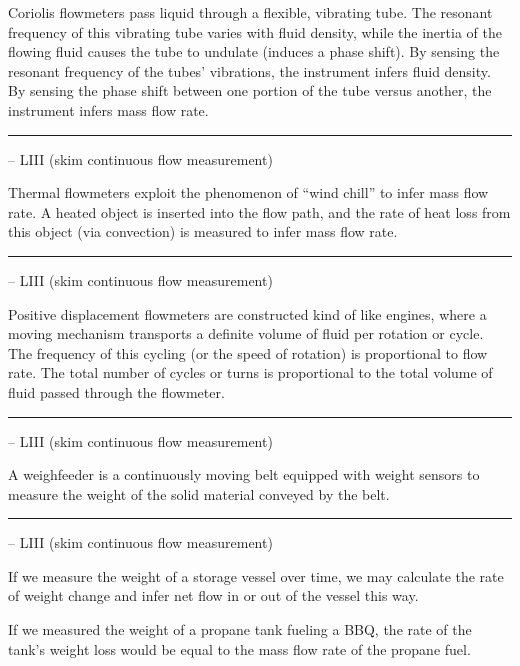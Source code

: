 Coriolis flowmeters pass liquid through a flexible, vibrating tube.  The resonant frequency of this vibrating tube varies with fluid density, while the inertia of the flowing fluid causes the tube to undulate (induces a phase shift).  By sensing the resonant frequency of the tubes' vibrations, the instrument infers fluid density.  By sensing the phase shift between one portion of the tube versus another, the instrument infers mass flow rate.

\vskip 5pt \hrule \vskip 5pt  -- LIII (skim continuous flow measurement) \vskip 10pt

Thermal flowmeters exploit the phenomenon of ``wind chill'' to infer mass flow rate.  A heated object is inserted into the flow path, and the rate of heat loss from this object (via convection) is measured to infer mass flow rate.

\vskip 5pt \hrule \vskip 5pt  -- LIII (skim continuous flow measurement) \vskip 10pt

Positive displacement flowmeters are constructed kind of like engines, where a moving mechanism transports a definite volume of fluid per rotation or cycle.  The frequency of this cycling (or the speed of rotation) is proportional to flow rate.  The total number of cycles or turns is proportional to the total volume of fluid passed through the flowmeter.

\vskip 5pt \hrule \vskip 5pt  -- LIII (skim continuous flow measurement) \vskip 10pt

A weighfeeder is a continuously moving belt equipped with weight sensors to measure the weight of the solid material conveyed by the belt.

\vskip 5pt \hrule \vskip 5pt  -- LIII (skim continuous flow measurement) \vskip 10pt

If we measure the weight of a storage vessel over time, we may calculate the rate of weight change and infer net flow in or out of the vessel this way.

\vskip 10pt

If we measured the weight of a propane tank fueling a BBQ, the rate of the tank's weight loss would be equal to the mass flow rate of the propane fuel.

